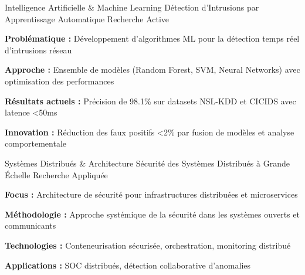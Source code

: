 
\begin{cventries}

    \cventry
    {Intelligence Artificielle \& Machine Learning}
    {Détection d'Intrusions par Apprentissage Automatique} %
    {Recherche Active} %
    {} %
    {
        \begin{cvitems} %
            \item {\textbf{Problématique :} Développement d'algorithmes ML pour la détection temps réel d'intrusions réseau}
            \item {\textbf{Approche :} Ensemble de modèles (Random Forest, SVM, Neural Networks) avec optimisation des performances}
            \item {\textbf{Résultats actuels :} Précision de 98.1\% sur datasets NSL-KDD et CICIDS avec latence <50ms}
            \item {\textbf{Innovation :} Réduction des faux positifs <2\% par fusion de modèles et analyse comportementale}
        \end{cvitems}
    }

    \cventry
    {Systèmes Distribués \& Architecture}
    {Sécurité des Systèmes Distribués à Grande Échelle} %
    {Recherche Appliquée} %
    {} %
    {
        \begin{cvitems} %
            \item {\textbf{Focus :} Architecture de sécurité pour infrastructures distribuées et microservices}
            \item {\textbf{Méthodologie :} Approche systémique de la sécurité dans les systèmes ouverts et communicants}
            \item {\textbf{Technologies :} Conteneurisation sécurisée, orchestration, monitoring distribué}
            \item {\textbf{Applications :} SOC distribués, détection collaborative d'anomalies}
        \end{cvitems}
    }


\end{cventries}
